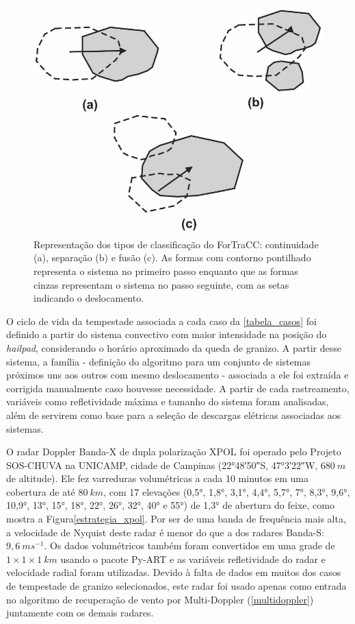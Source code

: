 \begin{figure}[htb]
	\begin{center}
		\caption{Representação dos tipos de classificação do ForTraCC: continuidade (a), separação (b) e fusão (c). As formas com contorno pontilhado representa o sistema no primeiro passo enquanto que as formas cinzas representam o sistema no passo seguinte, com as setas indicando o deslocamento.} 
		\label{fortracc_teoria}
		\includegraphics[width=0.5\columnwidth]{figs/fortracc_classes.png}
	\end{center}
\end{figure}

O ciclo de vida da tempestade associada a cada caso da \autoref{tabela_casos} foi definido a partir do sistema convectivo com maior intensidade na posição do \textit{hailpad}, considerando o horário aproximado da queda de granizo. A partir desse sistema, a família - definição do algoritmo para um conjunto de sistemas próximos uns aos outros com mesmo deslocamento - associada a ele foi extraída e corrigida manualmente caso houvesse necessidade. A partir de cada rastreamento, variáveis como refletividade máxima e tamanho do sistema foram analisadas, além de servirem como base para a seleção de descargas elétricas associadas aos sistemas.

O radar Doppler Banda-X de dupla polarização XPOL foi operado pelo Projeto SOS-CHUVA na UNICAMP, cidade de Campinas (\ang{22;48;50}\:S, \ang{47;3;22}\:W, $680\:m$ de altitude). Ele fez varreduras volumétricas a cada 10 minutos em uma cobertura de até $80\:km$, com 17 elevações (\ang{0,5}, \ang{1,8}, \ang{3,1}, \ang{4,4}, \ang{5,7}, \ang{7}, \ang{8,3}, \ang{9,6}, \ang{10,9}, \ang{13}, \ang{15}, \ang{18}, \ang{22}, \ang{26}, \ang{32}, \ang{40} e \ang{55}) de \ang{1,3} de abertura do feixe, como mostra a Figura\autoref{estrategia_xpol}. Por ser de uma banda de frequência mais alta, a velocidade de Nyquist deste radar é menor do que a dos radares Banda-S: $9,6\:ms^{-1}$. Os dados volumétricos também foram convertidos em uma grade de $1 \times 1 \times 1\:km$ usando o pacote Py-ART \cite{Helmus2016} e as variáveis refletividade do radar e velocidade radial foram utilizadas. Devido à falta de dados em muitos dos casos de tempestade de granizo selecionados, este radar foi usado apenas como entrada no algoritmo de recuperação de vento por Multi-Doppler (\autoref{multidoppler}) juntamente com os demais radares.

